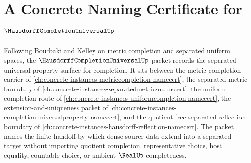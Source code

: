 \chapter{A Concrete Naming Certificate for $\HausdorffCompletionUniversalUp$}
\label{ch:concrete-instances-hausdorff-completion-universal-namecert}

Following Bourbaki and Kelley on metric completion and separated uniform spaces, the $\HausdorffCompletionUniversalUp$ packet records the separated universal-property surface for completion. It sits between the metric completion carrier of \autoref{ch:concrete-instances-metriccompletion-namecert}, the separated metric boundary of \autoref{ch:concrete-instances-separatedmetric-namecert}, the uniform completion route of \autoref{ch:concrete-instances-uniformcompletion-namecert}, the extension-and-uniqueness packet of \autoref{ch:concrete-instances-completionuniversalproperty-namecert}, and the quotient-free separated reflection boundary of \autoref{ch:concrete-instances-hausdorff-reflection-namecert}. The packet names the finite handoff by which dense source data extend into a separated target without importing quotient completion, representative choice, host equality, countable choice, or ambient $\RealUp$ completeness.

